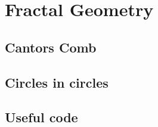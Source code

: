 \documentclass[12pt]{article}
\begin{document}
\section{Fractal Geometry}
\subsection{Cantors Comb}
\subsection{Circles in circles}

\begin{appendices}
    \section{Useful code}
    \inputminted{c++}{complex.hpp}
\end{appendices}
\end{document}
